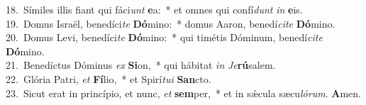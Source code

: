 {18.~}Símiles illis fiant qui fáci\textit{unt} \textbf{e}a:~* et omnes qui confí\textit{dunt} \textit{in} \textbf{e}is.\\
{19.~}Domus Israël, benedíci\textit{te} \textbf{Dó}mino:~* domus Aaron, benedí\textit{ci}\textit{te} \textbf{Dó}mino.\\
{20.~}Domus Levi, benedíci\textit{te} \textbf{Dó}mino:~* qui timétis Dóminum, benedí\textit{ci}\textit{te} \textbf{Dó}mino.\\
{21.~}Benedíctus Dóminus \textit{ex} \textbf{Si}on,~* qui hábitat \textit{in} \textit{Je}\textbf{rú}salem.\\
{22.~}Glória Patri, \textit{et} \textbf{Fí}lio,~* et Spirí\textit{tu}\textit{i} \textbf{San}cto.\\
{23.~}Sicut erat in princípio, et nunc, \textit{et} \textbf{sem}per,~* et in sǽcula sæcu\textit{ló}\textit{rum}. \textbf{A}men.\\
